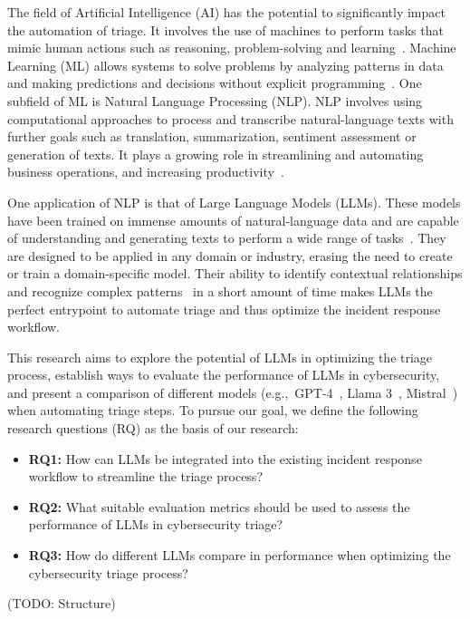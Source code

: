 The field of Artificial Intelligence (AI) has the potential to significantly impact the automation of triage.
It involves the use of machines to perform tasks that mimic human actions such as reasoning, problem-solving and
learning\ \citep{oed:ai}.
Machine Learning (ML) allows systems to solve problems by analyzing patterns in data and making
predictions and decisions without explicit programming\ \citep{oed:ml}.
One subfield of ML is Natural Language Processing (NLP).
NLP involves using computational approaches to process and transcribe natural-language texts with further goals such as
translation, summarization, sentiment assessment or generation of texts.
It plays a growing role in streamlining and automating business operations, and increasing
productivity\ \citep{ibm:nlp}.

One application of NLP is that of Large Language Models (LLMs).
These models have been trained on immense amounts of natural-language data and are capable of understanding and
generating texts to perform a wide range of tasks\ \citep{ibm:llm}.
They are designed to be applied in any domain or industry, erasing the need to create or train a domain-specific model.
Their ability to identify contextual relationships and recognize complex patterns\ \citep{bordt2024data} in a short
amount of time makes LLMs the perfect entrypoint to automate triage and thus optimize the incident response workflow.

This research aims to explore the potential of LLMs in optimizing the triage process, establish ways to
evaluate the performance of LLMs in cybersecurity, and present a comparison of different models
(e.g.,\ GPT-4\ \citep{achiam2023gpt}, Llama 3\ \citep{meta:llama3}, Mistral\ \citep{jiang2023mistral}) when automating
triage steps.
To pursue our goal, we define the following research questions (RQ) as the basis of our research:

\begin{itemize}
    \item \textbf{RQ1:} How can LLMs be integrated into the existing incident response workflow to streamline the triage
    process?
    \item \textbf{RQ2:} What suitable evaluation metrics should be used to assess the performance of LLMs in
    cybersecurity triage?
    \item \textbf{RQ3:} How do different LLMs compare in performance when optimizing the cybersecurity triage process?
\end{itemize}

(TODO: Structure) %
